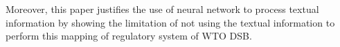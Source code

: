 Moreover, this paper justifies the use of neural network to process textual information by showing the limitation of not using the textual information 
to perform this mapping of regulatory system of WTO DSB. 








% 

% 



